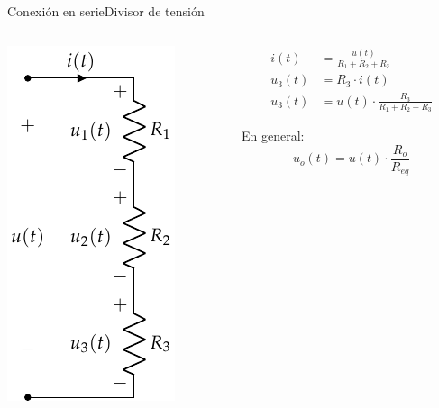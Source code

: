 \documentclass[aspectratio=169, xcolor={usenames,svgnames,dvipsnames}]{beamer}
\begin{document}
\begin{frame}{Conexión en serie}{Divisor de tensión}
\begin{columns}
\begin{column}{0.3\columnwidth}
\begin{center}
\includegraphics[height=0.85\textheight]{../figs/AsociacionSerie.pdf}
\end{center}
\end{column}
\begin{column}{0.7\columnwidth}
\begin{align*}
  i(t) &= \frac{u(t)}{R_1 + R_2 + R_3}\\
  u_3(t) &= R_3 \cdot i(t)\\ 
  u_3(t) &= u(t) \cdot \frac{R_3}{R_1 + R_2 + R_3}  
\end{align*}

En general:
\begin{equation*}
  \boxed{u_o(t) = u(t) \cdot \frac{R_o}{R_{eq}}}
\end{equation*}
\end{column}
\end{columns}
\end{frame}
\end{document}
